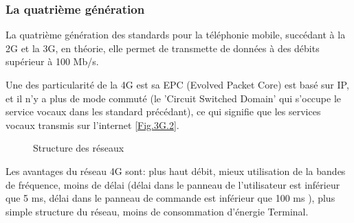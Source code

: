 \subsubsection{La quatrième génération}
La quatrième génération des standards pour la téléphonie mobile, succédant à la 2G et la 3G, en théorie, elle permet de transmette de données à des débits supérieur à 100 Mb/s. 

Une des particularité de la 4G est sa EPC (Evolved Packet Core) est basé sur IP, et il n'y a plus de mode commuté (le 'Circuit Switched Domain' qui s'occupe le service vocaux dans les standard précédant), ce qui signifie que les services vocaux transmis sur l'internet \ref{Fig.3G.2}. 



\begin{figure}[H]
	\centering
	\hfill		
	\hspace{1in}
	\caption{Structure des réseaux} 
		\label{Fig.3G}
\end{figure}
Les avantages du réseau 4G sont:  plus haut débit, mieux utilisation de la bandes de fréquence, moins de délai (délai dans le panneau de l'utilisateur est inférieur que 5 ms, délai dans le panneau de commande est inférieur que 100 ms ), plus simple structure du réseau, moins de consommation d'énergie Terminal.

